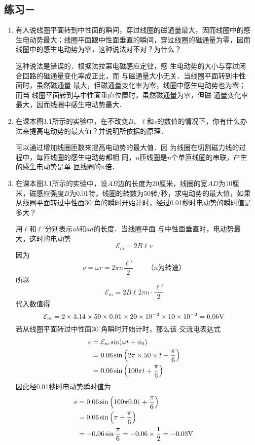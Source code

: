 \subsection{练习－}
\begin{enumerate}
    \item 有人说线圈平面转到中性面的瞬间，穿过线圈的磁通量最大，因而线圈中的感生电动势最大；线圈平面跟中性面垂直的瞬间，穿过线圈的磁通量为零，因而线圈中的感生电动势为零，这种说法对不对？为什么？


    \begin{solution}
        这种说法是错误的．根据法拉第电磁感应定律，感
        生电动势的大小与穿过闭合回路的磁通量变化率成正比，而
        与磁通量大小无关．当线圈平面转到中性面时，虽然磁通量
        最大，但磁通量变化率为零，线圈中感生电动势也为零；而当
        线圈平面转到与中性面垂直位置时，虽然磁通量为零，但磁
        通量变化率最大，因而线圈中感生电动势最大．
    \end{solution}
    
    \item 在课本图3.1所示的实验中，在不改变$B$、$\ell$和$v$的数值的情况下，你有什么办法来提高电动势的最大值？并说明所依据的原理．


    \begin{solution}
        可以通过增加线圈匝数来提高电动势的最大值．因
        为线圈在切割磁力线的过程中，每匝线圈的感生电动势都相
        同，$n$匝线圈是$n$个单匝线圈的串联，产生的感生电动势是单
        匝线圈的$n$倍．
    \end{solution}
    
    \item 在课本图3.1所示的实验中，设$AB$边的长度为20厘米，线圈的宽$AD$为10厘米，磁感应强度$B$为0.01特，线圈的转数为50转/秒，求电动势的最大值，如果从线圈平面转过中性面30$^\circ$角的瞬时开始计时，经过0.01秒时电动势的瞬时值是多大？


    \begin{solution}
        用$\ell$和$\ell'$分别表示$ab$和$ad$的长度．当线圈平面
        与中性面垂直时，电动势最大，这时的电动势
    \[\mathcal{E}_m=2B\ell v\]
    因为
\[v=\omega r=2\pi n\frac{\ell'}{2}\qquad \text{（$n$为转速）}\]
所以
\[\mathcal{E}_m=2B\ell2\pi n\cdot \frac{\ell'}{2} \]
代入数值得
\[\mathcal{E}_m=2\times3.14\times50\times0.01\times20\times10^{-2}\times10\times10^{-2}=0.06{\rm V}\]
若从线圈平面转过中性面$30^{\circ}$角瞬时开始计时，那么该
交流电表达式
\[\begin{split}
   e&= \mathcal{E}_m \sin(\omega t+\phi_0)\\
   &=0.06\sin\left(2\pi \times50\times t+\frac{\pi}{6}\right)\\
   &=0.06\sin\left(100\pi  t+\frac{\pi}{6}\right)
\end{split}\]
因此经0.01秒时电动势瞬时值为
\[\begin{split}
    e &=0.06\sin\left(100\pi  0.01+\frac{\pi}{6}\right)\\
    &=0.06\sin\left(\pi +\frac{\pi}{6}\right)\\
    &=-0.06\sin\frac{\pi}{6}=-0.06\times \frac{1}{2}= -0.03{\rm V}
 \end{split}\]
    \end{solution}
    

\end{enumerate}
